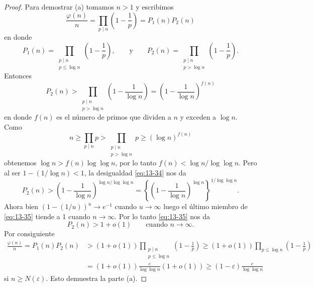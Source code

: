 \begin{proof}
        Para demostrar (a) tomamos $n>1$ y escribimos
        \begin{equation*}
            \frac{\varphi(n)}{n}=\prod_{p\mid n}\left(1-\frac{1}{p}\right)=P_1(n)P_2(n)
        \end{equation*}
        en donde
        \begin{equation*}
            P_1(n)=\prod_{\substack{p\mid n\\p\leq\log n}}\left(1-\frac{1}{p}\right),\qquad\text{y}\qquad P_2(n)=\prod_{\substack{p\mid n\\p>\log n}}\left(1-\frac{1}{p}\right).
        \end{equation*}
        Entonces
        \begin{equation}\label{eq:13-34}
            P_2(n)>\prod_{\substack{p\mid n\\p>\log n}}\left(1-\frac{1}{\log n}\right)=\left(1-\frac{1}{\log n}\right)^{f(n)}
        \end{equation}
        en donde $f(n)$ es el número de primos que dividen a $n$ y exceden a $\log n$. Como
        \begin{equation*}
            n\geq\prod_{p\mid n}p>\prod_{\substack{p\mid n\\p>\log n}}p\geq(\log n)^{f(n)}
        \end{equation*}
        obtenemos $\log n>f(n)\log\log n$, por lo tanto $f(n)<\log n/\log\log n$. Pero al ser
        $1-(1/\log n)<1$, la desigualdad \eqref{eq:13-34} nos da
        \begin{equation}\label{eq:13-35}
            P_2(n)>\left(1-\frac{1}{\log n}\right)^{\log n/\log\log n}=\left\{\left(1-\frac{1}{\log n}\right)^{\log n}\right\}^{1/\log\log n}.
        \end{equation}
        Ahora bien $(1-(1/u))^u\to e^{-1}$ cuando $u\to\infty$ luego el último miembro de
        \eqref{eq:13-35} tiende a 1 cuando $n\to\infty$. Por lo tanto \eqref{eq:13-35} nos da
        \begin{equation*}
            P_2(n)>1+o(1)\qquad\text{cuando }n\to\infty.
        \end{equation*}
        Por consiguiente
        \begin{align*}
            \frac{\varphi(n)}{n}=P_1(n)P_2(n)&>(1+o(1))\prod_{\substack{p\mid n\\p\leq\log n}}\left(1-\frac{1}{p}\right)\geq(1+o(1))\prod_{p\leq\log n}\left(1-\frac{1}{p}\right)\\
            &=(1+o(1))\frac{c}{\log\log n}(1+o(1))\geq(1-\varepsilon)\frac{c}{\log\log n}
        \end{align*}
        si $n\geq N(\varepsilon)$. Esto demuestra la parte (a).
    \end{proof}

